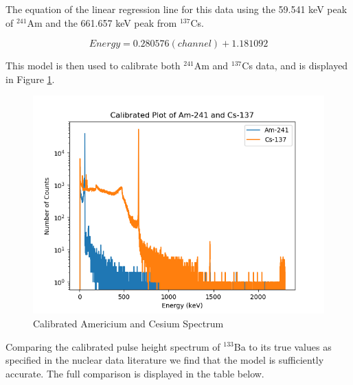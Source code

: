 
The equation of the linear regression line for this data using the 59.541 keV
peak of $^{241}$Am and the  661.657 keV peak from $^{137}$Cs.

\begin{equation}
Energy=0.280576(channel)+1.181092
\end{equation}

This model is then used to calibrate both $^{241}$Am and $^{137}$Cs
data, and is displayed in Figure \ref{fig:fit}.



\begin{figure}[H]
\begin{center}
\includegraphics[width=.7\linewidth]{../images/cal_AmCs.png}
\caption{Calibrated Americium and Cesium Spectrum
\label{fig:fit}}
\end{center}

\end{figure}



Comparing the calibrated pulse height spectrum of $^{133}$Ba
to its true values as specified in the nuclear data literature
we find that the model is sufficiently accurate. The full comparison is
displayed in the table below.

